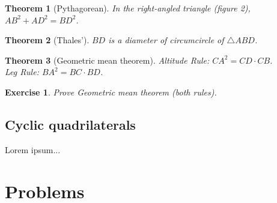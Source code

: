 \documentclass[11pt,a5paper]{article}
\newtheorem{exercise}{Exercise}
\newtheorem*{Theorem}{Theorem}
\begin{document}
\begin{Theorem}[Pythagorean]
	In the right-angled triangle (figure 2), $AB^2 + AD^2 = BD^2$.
\end{Theorem}
\begin{Theorem}[Thales']
	$BD$ is a diameter of circumcircle of $\triangle ABD$.
\end{Theorem}
\begin{Theorem}[Geometric mean theorem]
	Altitude Rule: $CA^2 = CD \cdot CB$.\\
	Leg Rule:  $BA^2 = BC \cdot BD$.
\end{Theorem}
\begin{exercise} Prove \emph{Geometric mean theorem} (both rules).
\end{exercise}

\subsection*{Cyclic quadrilaterals}

Lorem ipsum...

\section{Problems}
\end{document}
